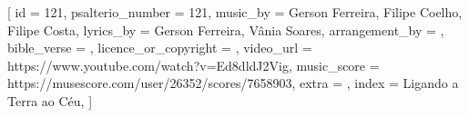 
[
    id                     = {121},
    psalterio_number       = {121},
    music_by               = {Gerson Ferreira, Filipe Coelho, Filipe Costa},
    lyrics_by              = {Gerson Ferreira, Vânia Soares},
    arrangement_by         = {},
    bible_verse            = {},
    licence_or_copyright   = {},
    video_url              = {https://www.youtube.com/watch?v=Ed8dldJ2Vig},
    music_score            = {https://musescore.com/user/26352/scores/7658903}, 
    extra                  = {},
    index                  = {Ligando a Terra ao Céu},
]


\beginverse

